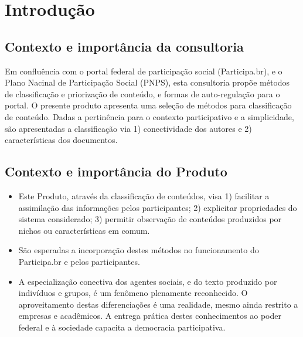 \documentclass[12pt]{article}
\newcommand{\PalavrasChave}{reconhecimento de padrões, redes complexas, processamento de linguagem natural, participação social}
\begin{document}



\tableofcontents
\newpage

\begin{abstract}
Este documento descreve procedimentos selecionados para categorização de conteúdo do portal federal da participação social (Participa.br). O produto relacionado no termo de referência desta consultoria preve somente propostas de especificações e códigos. Dado o aspecto prático do trabalho, estão descritas o contexto e possibilidade consideradas, asism como implementações e códigos operantes. Parte deste trabalho é acessível online via http, como os scripts no IPython Notebook e o endpoint SparQL que serve os dados do Participa.br com critérios semânticos.\\

{\bf Palavras-chave:} \PalavrasChave.
\end{abstract}
\newpage

\section{Introdução}
\subsection{Contexto e importância da consultoria}
Em confluência com o portal federal de participação social (Participa.br), e o Plano Nacinal de Participação Social (PNPS), esta consultoria propõe métodos de classificação e priorização de conteúdo,  e formas de auto-regulação para o portal. O presente produto apresenta uma seleção de métodos para classificação de conteúdo. Dadas a pertinência para o contexto participativo e a simplicidade, são apresentadas a classificação via 1) conectividade dos autores e 2) características dos documentos.
\subsection{Contexto e importância do Produto}
\begin{itemize}
    \item Este Produto, através da classificação de conteúdos, visa 1) facilitar a assimilação das informações pelos participantes; 2) explicitar propriedades do sistema considerado; 3) permitir observação de conteúdos produzidos por nichos ou características em comum.
    \item São esperadas a incorporação destes métodos no funcionamento do Participa.br e pelos participantes.
    \item A especialização conectiva dos agentes sociais, e do texto produzido por indivíduos e grupos, é um fenômeno plenamente reconhecido. O aproveitamento destas diferenciações é uma realidade, mesmo ainda restrito a empresas e acadêmicos. A entrega prática destes conhecimentos ao poder federal e à sociedade capacita a democracia participativa.
\end{itemize}
\end{document}
